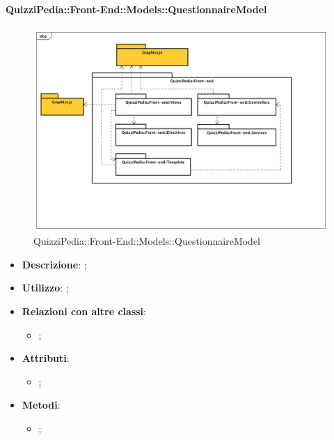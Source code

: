 		\paragraph{QuizziPedia::Front-End::Models::QuestionnaireModel}
		
			\label{QuizziPedia::Front-End::Models::QuestionnaireModel}
			
			\begin{figure}[h]
				\centering
				\includegraphics[scale=0.5,keepaspectratio]{UML/Package/QuizziPedia_Front-end.png}
				\caption{QuizziPedia::Front-End::Models::QuestionnaireModel}
			\end{figure}
			
			\begin{itemize}
				\item \textbf{Descrizione}: ;
				\item \textbf{Utilizzo}: ;
				\item \textbf{Relazioni con altre classi}: 
				\begin{itemize}
					\item ;
				\end{itemize}
				\item \textbf{Attributi}: 
				\begin{itemize}
					\item ;
				\end{itemize}
				\item \textbf{Metodi}: 
				\begin{itemize}
					\item ;
				\end{itemize}
			\end{itemize}
		
